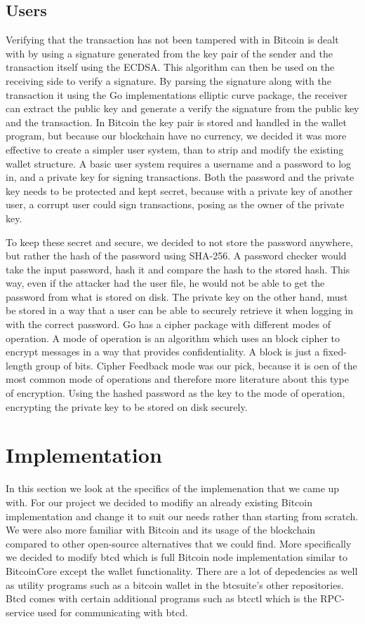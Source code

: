 \documentclass[12pt]{article}
\begin{document}
\subsection{Users}

Verifying that the transaction has not been tampered with in Bitcoin is dealt with by using a signature generated from the key pair of the sender and the transaction itself using the ECDSA. This algorithm can then be used on the receiving side to verify a signature. By parsing the signature along with the transaction it using the Go implementations elliptic curve package, the receiver can extract the public key and generate a verify the signature from the public key and the transaction. In Bitcoin the key pair is stored and handled in the wallet program, but because our blockchain have no currency, we decided it was more effective to create a simpler user system, than to strip and modify the existing wallet structure. A basic user system requires a username and a password to log in, and a private key for signing transactions. Both the password and the private key needs to be protected and kept secret, because with a private key of another user, a corrupt user could sign transactions, posing as the owner of the private key. 

To keep these secret and secure, we decided to not store the password anywhere, but rather the hash of the password using SHA-256. A password checker would take the input password, hash it and compare the hash to the stored hash. This way, even if the attacker had the user file, he would not be able to get the password from what is stored on disk. The private key on the other hand, must be stored in a way that a user can be able to securely retrieve it when logging in with the correct password. Go has a cipher package with different modes of operation. A mode of operation is an algorithm which uses an block cipher to encrypt messages in a way that provides confidentiality\cite{fergusonblock}. A block is just a fixed-length group of bits. Cipher Feedback mode was our pick, because it is oen of the most common mode of operations and therefore more literature about this type of encryption. Using the hashed password as the key to the mode of operation, encrypting the private key to be stored on disk securely. 

\section{Implementation}
In this section we look at the specifics of the implemenation that we came up with. For our project we decided to modifiy an already existing Bitcoin implementation and change it to suit our needs rather than starting from scratch. We were also more familiar with Bitcoin and its usage of the blockchain compared to other open-source alternatives that we could find. More specifically we decided to modify btcd\cite{btcsuite2015} which is full Bitcoin node implementation similar to BitcoinCore except the wallet functionality. There are a lot of depedencies as well as utility programs such as a bitcoin wallet in the btcsuite's other repositories. Btcd comes with certain additional programs such as btcctl which is the RPC-service used for communicating with btcd. 
\end{document}
